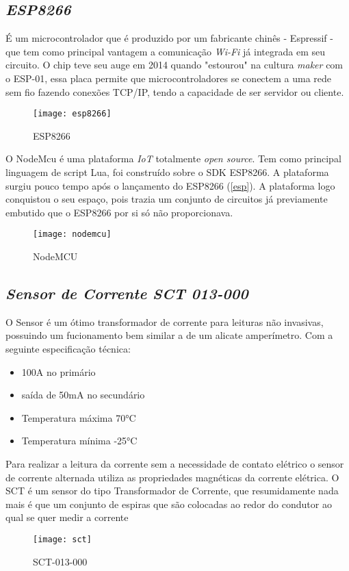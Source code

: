 \subsection[\textit{ESP8266}]{\textit{ESP8266}}\label{esp}
É um microcontrolador que é produzido por um fabricante chinês - Espressif - que tem como principal vantagem a comunicação \textit{Wi-Fi} já integrada em seu circuito.
O chip teve seu auge em 2014 quando "estourou" na cultura \textit{maker} com o ESP-01, essa placa permite que microcontroladores se conectem a uma rede
sem fio  fazendo conexões TCP/IP, tendo a capacidade de ser servidor ou cliente.

\begin{figure}[h!]
	\texttt{[image: esp8266]}
	\centering
	\caption[ESP8266]{ESP8266}
	\label{fig:esp8266}
\end{figure}
\FloatBarrier

O NodeMcu é uma plataforma \textit{IoT} totalmente \textit{open source}. Tem como principal linguagem de script Lua, foi construído sobre o SDK ESP8266.
A plataforma surgiu pouco tempo após o lançamento do ESP8266 (\autoref{esp}). A plataforma logo conquistou o seu espaço, pois trazia um conjunto
de circuitos já previamente embutido que o ESP8266 por si só não proporcionava.

\begin{figure}[h!]
	\texttt{[image: nodemcu]}
	\centering
	\caption[NodeMCU]{NodeMCU}
	\label{fig:nodemcu}
\end{figure}
\FloatBarrier

\subsection[\textit{Sensor de Corrente SCT 013-000}]{\textit{Sensor de Corrente SCT 013-000}}\label{sct}
O Sensor é um ótimo transformador de corrente para leituras não invasivas, possuindo um fucionamento bem similar a de um alicate amperímetro. Com a seguinte especificação
técnica: 
\begin{itemize}
	\item 100A no primário
	\item saída de 50mA no secundário
	\item Temperatura máxima \ang{70}C
	\item Temperatura mínima \ang{-25}C
\end{itemize} 
Para realizar a leitura da corrente sem a necessidade de contato elétrico o sensor de corrente alternada utiliza as propriedades 
magnéticas da corrente elétrica. O SCT é um sensor do tipo Transformador de Corrente, que resumidamente nada mais é que um conjunto de espiras que são
colocadas ao redor do condutor ao qual se quer medir a corrente 

\begin{figure}[h!]
	\texttt{[image: sct]}
	\centering
	\caption[SCT-013-000]{SCT-013-000}
	\label{fig:sct}
\end{figure}
\FloatBarrier
